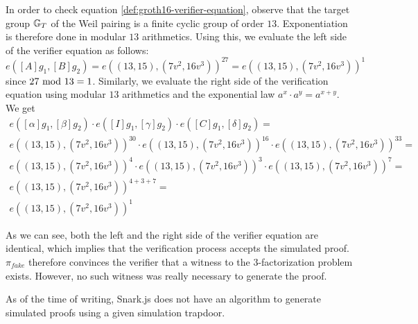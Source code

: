 \begin{example}
In order to check equation \eqref{def:groth16-verifier-equation}, observe that the target group $\mathbb{G}_T$ of the Weil pairing is a finite cyclic group of order $13$. Exponentiation is therefore done in modular $13$ arithmetics. Using this, we evaluate the left side of the verifier equation as follows:
$$
e([A]g_1,[B]g_2) = e((13,15),(7v^2,16v^3))^{27} =e((13,15),(7v^2,16v^3))^{1}
$$
since $27 \text{ mod } 13=1$. Similarly, we evaluate the right side of the verification equation using modular $13$ arithmetics and the exponential law $a^x\cdot a^y = a^{x+y}$. We get
\begin{align*}
e([\alpha]g_1,[\beta]g_2)\cdot e([I]g_1,[\gamma]g_2)\cdot e([C]g_1,[\delta]g_2) =\\
e((13,15),(7v^2,16v^3))^{30}\cdot e((13,15),(7v^2,16v^3))^{16}\cdot e((13,15),(7v^2,16v^3))^{33} =\\
e((13,15),(7v^2,16v^3))^{4}\cdot e((13,15),(7v^2,16v^3))^{3}\cdot e((13,15),(7v^2,16v^3))^{7} =\\
e((13,15),(7v^2,16v^3))^{4+3+7} = \\
e((13,15),(7v^2,16v^3))^{1}
\end{align*}

As we can see, both the left and the right side of the verifier equation are identical, which implies that the verification process accepts the simulated proof. $\pi_{fake}$ therefore convinces the verifier that a witness to the $3$-factorization problem exists. However, no such witness was really necessary to generate the proof.
\end{example}

\begin{example}
\label{ex:3-fac-groth-16-simulator-circom} As of the time of writing, Snark.js does not have an algorithm to generate simulated proofs using a given simulation trapdoor.
\end{example}



